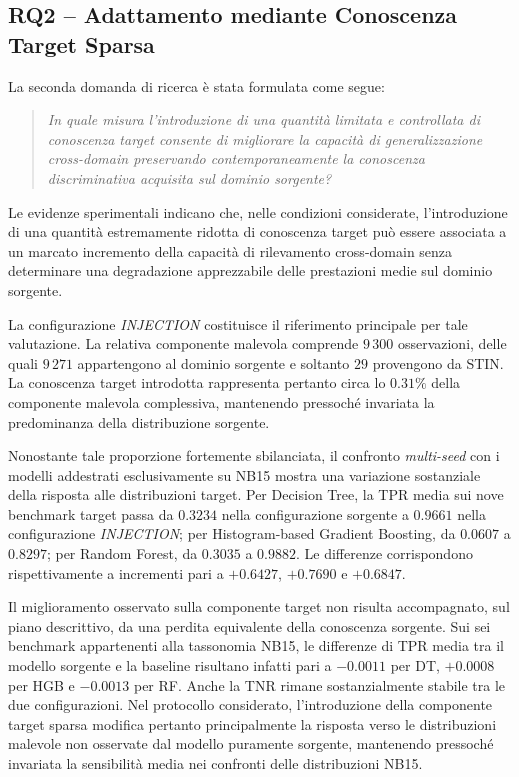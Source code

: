 
\subsection{RQ2 -- Adattamento mediante Conoscenza Target Sparsa}
\label{subsec:conclusioni_rq2}

La seconda domanda di ricerca è stata formulata come segue:

\begin{quote}
\textit{In quale misura l'introduzione di una quantità limitata e controllata di conoscenza target consente di migliorare la capacità di generalizzazione cross-domain preservando contemporaneamente la conoscenza discriminativa acquisita sul dominio sorgente?}
\end{quote}

Le evidenze sperimentali indicano che, nelle condizioni considerate, l'introduzione di una quantità estremamente ridotta di conoscenza target può essere associata a un marcato incremento della capacità di rilevamento cross-domain senza determinare una degradazione apprezzabile delle prestazioni medie sul dominio sorgente.

La configurazione \textit{INJECTION} costituisce il riferimento principale per tale valutazione.
La relativa componente malevola comprende $9\,300$ osservazioni, delle quali $9\,271$ appartengono al dominio sorgente e soltanto $29$ provengono da STIN.
La conoscenza target introdotta rappresenta pertanto circa lo $0.31\%$ della componente malevola complessiva, mantenendo pressoché invariata la predominanza della distribuzione sorgente.

Nonostante tale proporzione fortemente sbilanciata, il confronto \textit{multi-seed} con i modelli addestrati esclusivamente su NB15 mostra una variazione sostanziale della risposta alle distribuzioni target.
Per Decision Tree, la TPR media sui nove benchmark target passa da $0.3234$ nella configurazione sorgente a $0.9661$ nella configurazione \textit{INJECTION}; per Histogram-based Gradient Boosting, da $0.0607$ a $0.8297$; per Random Forest, da $0.3035$ a $0.9882$.
Le differenze corrispondono rispettivamente a incrementi pari a $+0.6427$, $+0.7690$ e $+0.6847$.

Il miglioramento osservato sulla componente target non risulta accompagnato, sul piano descrittivo, da una perdita equivalente della conoscenza sorgente.
Sui sei benchmark appartenenti alla tassonomia NB15, le differenze di TPR media tra il modello sorgente e la baseline risultano infatti pari a $-0.0011$ per DT, $+0.0008$ per HGB e $-0.0013$ per RF.
Anche la TNR rimane sostanzialmente stabile tra le due configurazioni.
Nel protocollo considerato, l'introduzione della componente target sparsa modifica pertanto principalmente la risposta verso le distribuzioni malevole non osservate dal modello puramente sorgente, mantenendo pressoché invariata la sensibilità media nei confronti delle distribuzioni NB15.

